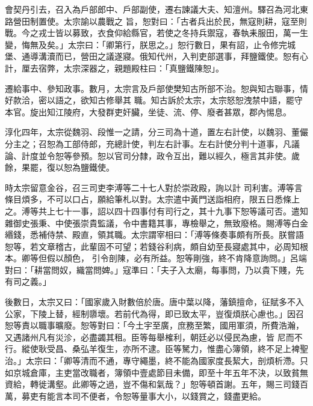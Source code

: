 \begin{pinyinscope}
 會契丹引去，召入為戶部郎中、戶部副使，遷右諫議大夫、知澶州。驛召為河北東路營田制置使。太宗諭以農戰之
 旨，恕對曰：「古者兵出於民，無寇則耕，寇至則戰。今之戎士皆以募致，衣食仰給縣官，若使之冬持兵禦寇，春執耒服田，萬一生變，悔無及矣。」太宗曰：「卿第行，朕思之。」恕行數日，果有詔，止令修完城堡、通導溝瀆而已，營田之議遂寢。俄知代州，入判吏部選事，拜鹽鐵使。恕有心計，厘去宿弊，太宗深器之，親題殿柱曰：「真鹽鐵陳恕」。



 遷給事中、參知政事。數月，太宗言及戶部使樊知古所部不治。恕與知古聯事，情好款洽，密以語之，欲知古修舉其
 職。知古訴於太宗，太宗怒恕洩禁中語，罷守本官。旋出知江陵府，大發群吏奸臟，坐徒、流、停、廢者甚眾，郡內惕息。



 淳化四年，太宗從魏羽、段惟一之請，分三司為十道，置左右計使，以魏羽、董儼分主之；召恕為工部侍郎，充總計使，判左右計事。左右計使分判十道事，凡議論、計度並令恕等參預。恕以官司分隸，政令互出，難以經久，極言其非使。歲餘，果罷，復以恕為鹽鐵使。



 時太宗留意金谷，召三司吏李溥等二十七人對於崇政殿，詢以計
 司利害。溥等言條目煩多，不可以口占，願給筆札以對。太宗遣中黃門送詣相府，限五日悉條上之。溥等共上七十一事，詔以四十四事付有司行之，其十九事下恕等議可否。遣知雜御史張秉、中使張崇貴監議，令中書籍其事，專檢舉之，無致廢格。賜溥等白金緡錢，悉補侍禁、殿直，領其職。太宗謂宰相曰：「溥等條奏事頗有所長。朕嘗語恕等，若文章稽古，此輩固不可望；若錢谷利病，頗自幼至長寢處其中，必周知根本。卿等但假以顏色，
 引令剖陳，必有所益。恕等剛強，終不肯降意詢問。」呂端對曰：「耕當問奴，織當問婢。」寇準曰：「夫子入太廟，每事問，乃以貴下賤，先有司之義。」



 後數日，太宗又曰：「國家歲入財數倍於唐。唐中葉以降，藩鎮擅命，征賦多不入公家，下陵上替，經制隳壞。若前代為得，即已致太平，豈復煩朕心慮也。」因召恕等責以職事曠廢。恕等對曰：「今土宇至廣，庶務至繁，國用軍須，所費浩瀚，又遇諸州凡有災沴，必盡蠲其租。臣等每舉榷利，朝廷必以侵民為慮，皆
 尼而不行。縱使耿受昌、桑弘羊復生，亦所不逮。臣等駑力，惟盡心簿領，終不足上裨聖治。」太宗曰：「卿等清而不通，專守繩墨，終不能為國家度長絜大，剖煩析滯。只如京城倉庫，主吏當改職者，簿領中壹處節目未備，即至十年五年不決，以致貧無資給，轉徙溝壑。此卿等之過，豈不傷和氣哉？」恕等頓首謝。五年，賜三司錢百萬，募吏有能言本司不便者，令恕等量事大小，以錢賞之，錢盡更給。




\end{pinyinscope}
